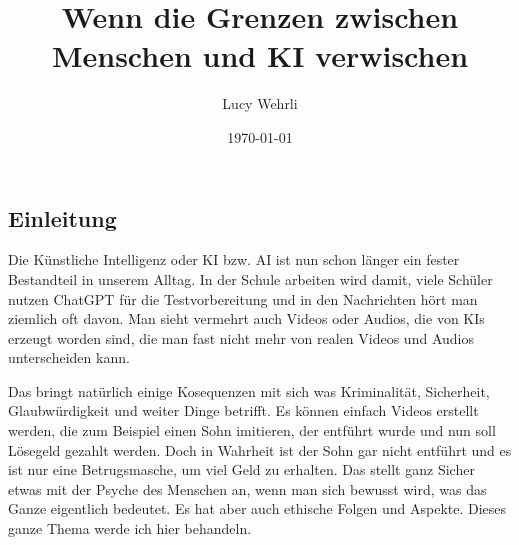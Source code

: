 \documentclass{report}
\title{Wenn die Grenzen zwischen Menschen und KI verwischen}
\author{Lucy Wehrli}
\date{\today}
\begin{document}
\maketitle


\tableofcontents

\chapter{}
\section{ Einleitung}

Die Künstliche Intelligenz oder KI bzw. AI ist nun schon länger ein fester Bestandteil in unserem Alltag. In der Schule arbeiten wird damit, viele Schüler nutzen ChatGPT für die Testvorbereitung und in den Nachrichten hört man ziemlich oft davon. Man sieht vermehrt auch Videos oder Audios, die von KIs erzeugt worden sind, die man fast nicht mehr von realen Videos und Audios unterscheiden kann.
\par 
Das bringt natürlich einige Kosequenzen mit sich was Kriminalität, Sicherheit, Glaubwürdigkeit und weiter Dinge betrifft. Es können einfach Videos erstellt werden, die zum Beispiel einen Sohn imitieren, der entführt wurde und nun soll Lösegeld gezahlt werden. Doch in Wahrheit ist der Sohn gar nicht entführt und es ist nur eine Betrugsmasche, um viel Geld zu erhalten. Das stellt ganz Sicher etwas mit der Psyche des Menschen an, wenn man sich bewusst wird, was das Ganze eigentlich bedeutet. Es hat aber auch ethische Folgen und Aspekte. Dieses ganze Thema werde ich hier behandeln.
\end{document}
